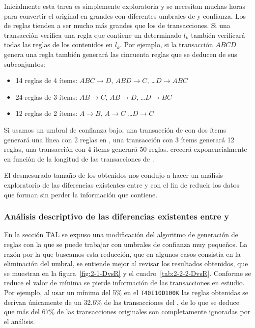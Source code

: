 Inicialmente esta tarea es simplemente exploratoria y se necesitan muchas horas para convertir el \dataset original \D en grandes \datasets \R con diferentes umbrales de \soporte y confianza. Los \datasets de reglas tienden a ser mucho más grandes que los de transacciones. Si una transacción verifica una regla que contiene un determinado \kitemset $l_k$ también verificará todas las reglas de los \itemsets contenidos en $l_k$. Por ejemplo, si la transacción $ABCD$ genera una regla también generará las cincuenta reglas que se deducen de sus subconjuntos:
\begin{itemize}
  \item 14 reglas de 4 ítems: $ABC\rightarrow D$, $ABD\rightarrow C$, \ldots $D\rightarrow ABC$
  \item 24 reglas de 3 ítems: $AB\rightarrow C$, $AB\rightarrow D$, \ldots $D\rightarrow BC$
  \item 12 reglas de 2 ítems: $A\rightarrow B$, $A\rightarrow C$ \ldots $D\rightarrow C$
\end{itemize}

Si usamos un umbral de confianza bajo, una transacción de \D con dos ítems generará una línea con 2 reglas en \R, una transacción con 3 ítems generará 12 reglas, una transacción con 4 ítems generará 50 reglas. \R crecerá exponencialmente en función de la longitud de las transacciones de \D.

El desmesurado tamaño de los \datasets \R obtenidos nos condujo a hacer un análisis exploratorio de las diferencias existentes entre \R y \D con el fin de reducir los datos que forman \R sin perder la información que contiene.




\subsubsection{Análisis descriptivo de las diferencias existentes entre \D y \R}
En la sección TAL se expuso una modificación del algoritmo de generación de reglas con la que se puede trabajar con umbrales de confianza muy pequeños. La razón por la que buscamos esta reducción, que en algunos casos consistía en la eliminación del umbral, se entiende mejor al revisar los resultados obtenidos, que se muestran en la figura~\ref{fig:2-1-DvsR} y el cuadro~\ref{tab:2-2-2-DvsR}. Conforme se reduce el valor de \confianza mínima se pierde información de las transacciones en estudio. Por ejemplo, al usar un \soporte mínimo del 5\% en el \dataset \texttt{T40I10D100K} las reglas obtenidas se derivan únicamente de un 32.6\% de las transacciones del \dataset, de lo que se deduce que más del 67\% de las transacciones originales son completamente ignoradas por el análisis.

